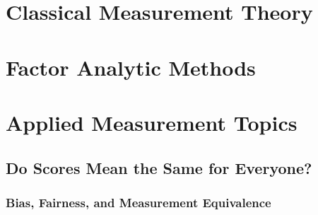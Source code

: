 \documentclass[
  11pt,
  letterpaper,
]{scrbook}
\begin{document}
\part{Classical Measurement Theory}

\chapter{}\label{section-2}

\chapter{}\label{section-3}

\chapter{}\label{section-4}

\part{Factor Analytic Methods}

\chapter{}\label{section-5}

\chapter{}\label{section-6}

\chapter{}\label{section-7}

\part{Applied Measurement Topics}

\chapter{Do Scores Mean the Same for Everyone?}\label{bias-fairness}

\section{Bias, Fairness, and Measurement
Equivalence}\label{bias-fairness-and-measurement-equivalence}
\end{document}
